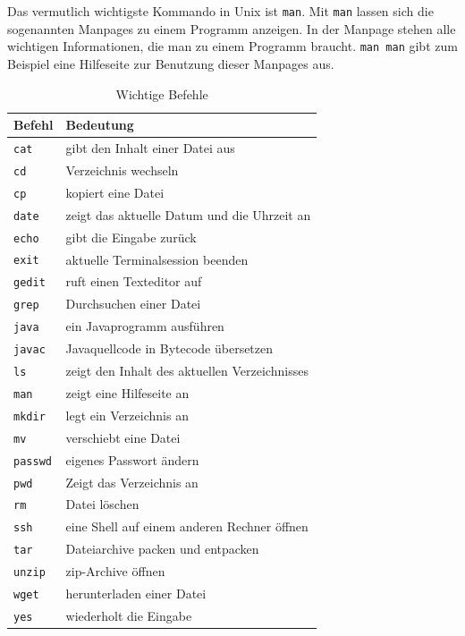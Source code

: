 Das vermutlich wichtigste Kommando in Unix ist \lstinline$man$. Mit \lstinline$man$ lassen sich die sogenannten Manpages zu einem Programm anzeigen. In der Manpage stehen alle wichtigen Informationen, die man zu einem Programm braucht.
\lstinline$man man$ gibt zum Beispiel eine Hilfeseite zur Benutzung dieser Manpages aus.

\begin{table}
\centering
\begin{tabular}{l|l}
Befehl & Bedeutung \\ \hline
\lstinline$cat$ & gibt den Inhalt einer Datei aus \\
\lstinline$cd$ & Verzeichnis wechseln \\
\lstinline$cp$ & kopiert eine Datei \\
\lstinline$date$ & zeigt das aktuelle Datum und die Uhrzeit an \\
\lstinline$echo$ & gibt die Eingabe zurück \\
\lstinline$exit$ & aktuelle Terminalsession beenden \\
\lstinline$gedit$ & ruft einen Texteditor auf \\
\lstinline$grep$ & Durchsuchen einer Datei \\
\lstinline$java$ & ein Javaprogramm ausführen \\
\lstinline$javac$ & Javaquellcode in Bytecode übersetzen \\
\lstinline$ls$ & zeigt den Inhalt des aktuellen Verzeichnisses \\
\lstinline$man$ & zeigt eine Hilfeseite an \\
\lstinline$mkdir$ & legt ein Verzeichnis an \\
\lstinline$mv$ & verschiebt eine Datei \\
\lstinline$passwd$ & eigenes Passwort ändern \\
\lstinline$pwd$ & Zeigt das Verzeichnis an \\
\lstinline$rm$ & Datei löschen \\
\lstinline$ssh$ & eine Shell auf einem anderen Rechner öffnen \\
\lstinline$tar$ & Dateiarchive packen und entpacken \\
\lstinline$unzip$ & zip-Archive öffnen \\
\lstinline$wget$ & herunterladen einer Datei \\
\lstinline$yes$ & wiederholt die Eingabe
\end{tabular}
\label{Befehle}
\caption{Wichtige Befehle}
\end{table}

